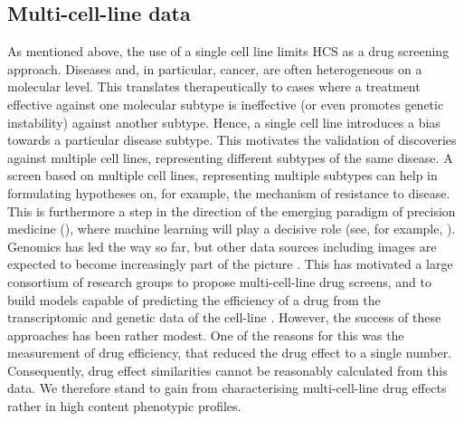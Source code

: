 \subsection{Multi-cell-line data}
\label{subsec:multi_cell_line_data}
As mentioned above, the use of a single cell line limits HCS as a drug screening approach. Diseases and, in particular, cancer, are often heterogeneous on a molecular level. This translates therapeutically to cases where a treatment effective against one molecular subtype is ineffective (or even promotes genetic instability) against another subtype. Hence, a single cell line introduces a bias towards a particular disease subtype. This motivates the validation of discoveries against multiple cell lines, representing different subtypes of the same disease. A screen based on multiple cell lines, representing multiple subtypes can help in formulating hypotheses on, for example, the mechanism of resistance to disease. This is furthermore a step in the direction of the emerging paradigm of precision medicine (\cite{ashley2016towards}), where machine learning will play a decisive role (see, for example, \cite{krittanawong2017artificial}). Genomics has led the way so far, but other data sources including images are expected to become increasingly part of the picture \cite{hulsen2019big}. This has motivated a large consortium of research groups to propose multi-cell-line drug screens, and to build models capable of predicting the efficiency of a drug from the transcriptomic and genetic data of the cell-line \cite{costello2014community}. However, the success of these approaches has been rather modest. One of the reasons for this was the measurement of drug efficiency, that reduced the drug effect to a single number. Consequently, drug effect similarities cannot be reasonably calculated from this data. We therefore stand to gain from characterising multi-cell-line drug effects rather in high content phenotypic profiles.

